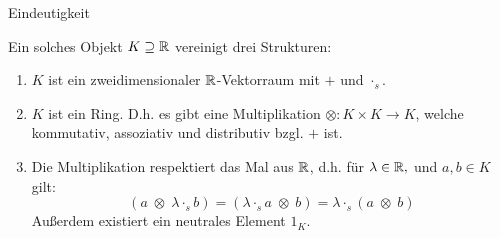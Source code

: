 \begin{frame}{Eindeutigkeit}
     \pause
  \begin{definition}
    Ein solches Objekt $K\supseteq \mathbb{R}$ vereinigt drei Strukturen:
    \begin{enumerate}
      \item<3->{$K$ ist ein zweidimensionaler $\mathbb{R}$-Vektorraum mit $+$ und $\cdot_s$.}
      \item<4->{$K$ ist ein Ring. D.h. es gibt eine Multiplikation $\otimes:K\times K\to K$, welche kommutativ, assoziativ und distributiv bzgl. $+$ ist.}
      \item<5->{Die Multiplikation respektiert das Mal aus $\mathbb{R}$, d.h. für $\lambda\in \mathbb{R},$ und $a,b\in K$ gilt:
      \begin{equation*}
        (a\;\otimes\; \lambda \cdot_s b)=(\lambda \cdot_s a \;\otimes\; b)=\lambda \cdot_s (a\;\otimes\; b)
      \end{equation*}
      Außerdem existiert ein neutrales Element $1_K$.}
    \end{enumerate}
  \end{definition}
\end{frame}

